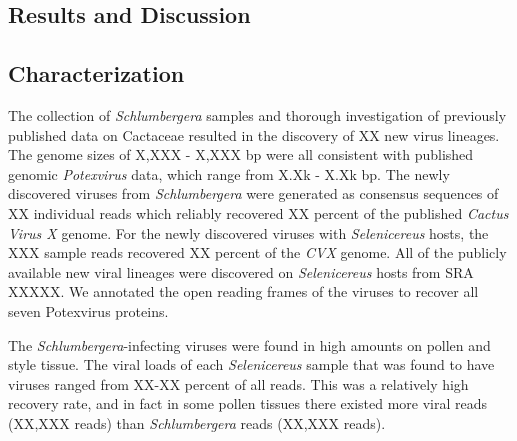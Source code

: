 \documentclass[11pt,letterpaper,titlepage]{article}
\begin{document}
\begin{linenumbers}
\section*{Results and Discussion}
\subsection*{Characterization}
The collection of \textit{Schlumbergera} samples and thorough investigation of previously published data on Cactaceae resulted in the discovery of XX new virus lineages.
The genome sizes of X,XXX - X,XXX bp were all consistent with published genomic \textit{Potexvirus} data, which range from X.Xk - X.Xk bp.
The newly discovered viruses from \textit{Schlumbergera} were generated as consensus sequences of XX individual reads which reliably recovered XX percent of the published\textit{ Cactus Virus X} genome. 
For the newly discovered viruses with \textit{Selenicereus} hosts, the XXX sample reads recovered XX percent of the \textit{CVX} genome.
All of the publicly available new viral lineages were discovered on \textit{Selenicereus} hosts from SRA XXXXX.
We annotated the open reading frames of the viruses to recover all seven Potexvirus proteins.

The \textit{Schlumbergera}-infecting viruses were found in high amounts on pollen and style tissue.
The viral loads of each \textit{Selenicereus} sample that was found to have viruses ranged from XX-XX percent of all reads.
This was a relatively high recovery rate, and in fact in some pollen tissues there existed more viral reads (XX,XXX reads) than \textit{Schlumbergera} reads (XX,XXX reads).


\end{linenumbers}
\end{document}
